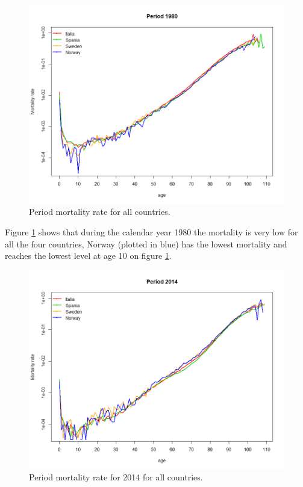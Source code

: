            \begin{figure}[t]
             \centering
              \includegraphics[width=0.8\linewidth]{figures/periodMortalityRate_allCountries1980.png}
              \caption{Period mortality rate for all countries.}
              \label{fig:Period mortalityRate 1980}
            \end{figure} 
            
Figure \ref{fig:Period mortalityRate 1980} shows that during the calendar year 1980  the mortality is very low for all the four countries, Norway (plotted in blue) has the lowest mortality and reaches the lowest level at age 10 on figure \ref{fig:Period mortalityRate 1980}. 

          \begin{figure}[tbh]
             \centering
              \includegraphics[width=0.8\linewidth]{figures/periodMortalityRate_allCountries2014.png}
              \caption{Period mortality rate for 2014 for all countries.}
              \label{fig:Period mortalityRate 2014}
            \end{figure} 
            
